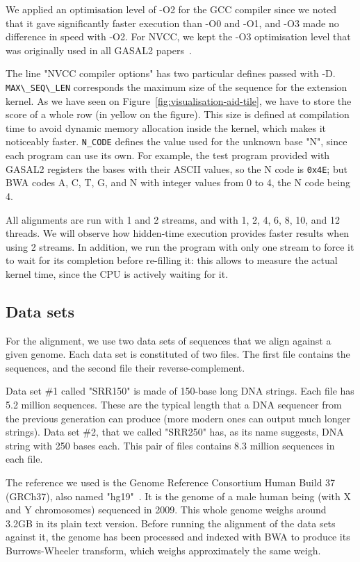 We applied an optimisation level of -O2 for the GCC compiler since we noted that it gave significantly faster execution than -O0 and -O1, and -O3 made no difference in speed with -O2. For NVCC, we kept the -O3 optimisation level that was originally used in all GASAL2 papers~\cite{Ahmed:gasal}.

The line "NVCC compiler options" has two particular defines passed with -D. \verb|MAX\_SEQ\_LEN| corresponds the maximum size of the sequence for the extension kernel. As we have seen on Figure~\ref{fig:visualisation-aid-tile}, we have to store the score of a whole row (in yellow on the figure). This size is defined at compilation time to avoid dynamic memory allocation inside the kernel, which makes it noticeably faster. \verb|N_CODE| defines the value used for the unknown base "N", since each program can use its own. For example, the test program provided with GASAL2 registers the bases with their ASCII values, so the N code is \verb|0x4E|; but BWA codes A, C, T, G, and N with integer values from 0 to 4, the N code being 4.

All alignments are run with 1 and 2 streams, and with 1, 2, 4, 6, 8, 10, and 12 threads. We will observe how hidden-time execution provides faster results when using 2 streams. In addition, we run the program with only one stream to force it to wait for its completion before re-filling it: this allows to measure the actual kernel time, since the CPU is actively waiting for it. 

\subsection{Data sets}

For the alignment, we use two data sets of sequences that we align against a given genome. Each data set is constituted of two files. The first file contains the sequences, and the second file their reverse-complement. 

Data set \#1 called "SRR150" is made of 150-base long DNA strings. Each file has 5.2 million sequences. These are the typical length that a DNA sequencer from the previous generation can produce (more modern ones can output much longer strings). Data set \#2, that we called "SRR250" has, as its name suggests, DNA string with 250 bases each. This pair of files contains 8.3 million sequences in each file.

The reference we used is the Genome Reference Consortium Human Build 37 (GRCh37), also named "hg19"~\cite{ncbi:hg19}. It is the genome of a male human being (with X and Y chromosomes) sequenced in 2009. This whole genome weighs around 3.2GB in its plain text version. Before running the alignment of the data sets against it, the genome has been processed and indexed with BWA to produce its Burrows-Wheeler transform, which weighs approximately the same weigh.

